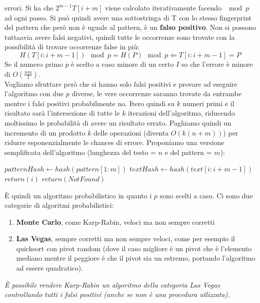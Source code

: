 \documentclass[a4paper,12pt, oneside]{book}
\begin{document}
errori. Si ha che $  2^{m-1} T [i + m]$ viene calcolato iterativamente facendo
$\mod p$ ad ogni passo. Si può quindi avere una sottostringa di T con lo stesso
fingerprint del pattern che però non è uguale al pattern,
è un \textbf{falso positivo}. Non si possono tuttaavia avere falsi negativi,
quindi tutte le occorrenze sono trovate con la possibilità di trovare occorrenze
false in più:
\[H(T [i : i + m - 1]) \mod p = H(P) \mod p \Leftarrow T [i : i + m - 1] = P\]
Se il numero primo $p$ è scelto a caso minore di un certo $I$ so che
l'errore è minore di $O(\frac{nm}{I})$.\\
Vogliamo sfruttare però che si hanno solo falsi positivi e provare ad
eseguire l'algoritmo con due $p$ diverse, le vere occorrenze saranno
trovate da entrambe mentre i falsi positivi probabilmente no. Itero
quindi su $k$ numeri primi e il risultato sarà l'intersezione di tutte
le $k$ iterazioni dell'algoritmo, riducendo moltissimo le probabilità di
avere un risultato errato. Paghiamo quindi un incremento di un prodotto
$k$ delle operazioni (diventa $O(k(n+m))$) per ridurre esponenzialmente
le chances di errore.
\newpage
Proponiamo una versione semplificata dell'algoritmo (lunghezza del
testo = $n$ e del pattern = $m$):
\begin{shaded}
  \begin{algorithmic}
    \State $patternHash \gets hash(pattern[1:m])$
    \State $textHash \gets hash(text[i : i + m - 1])$
    \State $return(i)$
    \EndIf
    \EndIf
    \EndFor
    \State $return(NotFound)$
    \EndFunction
  \end{algorithmic}
\end{shaded}
È quindi un algoritmo probabilistico in quanto i $p$ sono scelti a
caso. Ci sono due categorie di algoritmi probabilistici:
\begin{enumerate}
  \item \textbf{Monte Carlo}, come Karp-Rabin, veloci ma non sempre
  corretti
  \item \textbf{Las Vegas}, sempre corretti ma non sempre veloci, come
  per esempio il quicksort con pivot random (dove il caso migliore è un 
  pivot che è l'elemento mediano mentre il peggiore è che il pivot 
  sia un estremo, portando l'algoritmo ad essere quadratico).
\end{enumerate}
\textit{È possibile rendere Karp-Rabin un algoritmo della categoria Las Vegas
  controllando tutti i falsi positivi (anche se non è una procedura utlizzata).}
\end{document}
